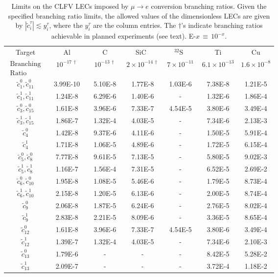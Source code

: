 \documentclass[12pt,letterpaper]{book}
\begin{document}
\begin{table}
\centering
{\renewcommand{\arraystretch}{1.5}
\begin{tabular}{ccccccc}
\hline
\hline
Target  &~~~Al~~~&~~~C~~~&~~SiC~~~&~~$^{32}$S~~~&~~~Ti~~~&~~~Cu~~~ \\[1.6pt]
$\begin{array}{l} \mathrm{Branching} \\  \mathrm{Ratio} \end{array}$ & $10^{-17 \, \dagger}$ & $10^{-13 \, \dagger}$ & $2 \times 10^{-14 \, \dagger}$ & $7 \times 10^{-11}$ &  $6.1 \times 10^{-13}$ & $1.6 \times 10^{-8}$  \\
\hline
$\tilde{c}_1^0,\tilde{c}_{11}^0$ &~3.99E-10~ & ~5.10E-8~ & ~1.77E-8~& ~1.03E-6~ & ~7.38E-8~ & ~1.21E-5~ \\
$\tilde{c}_1^1,\tilde{c}_{11}^1$ &1.24E-8 & 6.29E-6 & 1.40E-6 & - & 1.32E-6 & 1.86E-4 \\
$\tilde{c}_3^0,\tilde{c}_{15}^0$ & 1.61E-8 & 3.96E-6 &7.33E-7 & 4.54E-5 & 3.80E-6 & 3.49E-4 \\
$\tilde{c}_3^1,\tilde{c}_{15}^1$ &1.86E-7 & 1.32E-4 & 4.03E-5 & - & 7.34E-6 & 2.13E-3 \\
$\tilde{c}_4^0$ & 1.42E-8 & 9.37E-6 & 4.11E-6 & - & 1.50E-5 & 5.91E-4 \\
$\tilde{c}_4^1$ & 1.71E-8 & 1.06E-5 & 4.89E-6 & - & 1.72E-5 & 6.15E-4 \\
$\tilde{c}_5^0,\tilde{c}_8^0$ &7.77E-8 & 9.61E-5 & 7.13E-5 & - & 5.80E-5 & 9.02E-3 \\
$\tilde{c}_5^1,\tilde{c}_8^1$ &1.16E-7 & 1.56E-4 & 7.31E-5 & - & 6.52E-5 & 2.69E-2 \\
$\tilde{c}_6^0,\tilde{c}_{10}^0$ & 1.95E-8 & 1.08E-5 & 5.46E-6 & - & 1.79E-5 & 8.73E-4 \\
$\tilde{c}_6^1,\tilde{c}_{10}^1$ & 2.15E-8 & 1.20E-5 & 6.13E-6 & - & 2.00E-5 & 8.74E-4 \\
$\tilde{c}_9^0$ & 2.06E-8 & 1.87E-5 & 6.24E-6 & - & 2.76E-5 & 8.02E-4 \\
$\tilde{c}_9^1$ & 2.83E-8 & 2.21E-5 & 8.09E-6 & - & 3.36E-5 & 8.65E-4 \\
$\tilde{c}_{12}^0$ & 1.61E-8 & 3.96E-6 & 7.33E-7 & 4.54E-5 & 3.80E-6 & 3.49E-4 \\
$\tilde{c}_{12}^1$ & 1.39E-7 & 1.32E-4 & 4.03E-5 & - & 7.34E-6 & 2.10E-3 \\
$\tilde{c}_{13}^0$ & 1.79E-6 & - & - & - & 8.42E-5 & 5.28E-2 \\
$\tilde{c}_{13}^1$ & 2.09E-7 & - & - & - & 3.72E-4 & 1.18E-2 \\[2.6pt]
\hline
\hline
\end{tabular}
}
\caption{Limits on the CLFV LECs imposed by $\mu \rightarrow e$ conversion branching ratios. 
Given the specified branching ratio limits, the allowed values of the dimensionless LECs are 
given by $|\tilde{c}_i^\tau| \lesssim y_i^\tau$, where the $y_i^\tau$ are the column entries.  The $\dagger$'s indicate  
branching ratios achievable in planned experiments (see text).   E-$x \, \equiv \,10^{-x}.$ \cite{BADERTSCHER1982406} \cite{wintz} \cite{PhysRevLett.28.1469}}
\label{tab:LEC_limits}
\end{table} 
\end{document}
